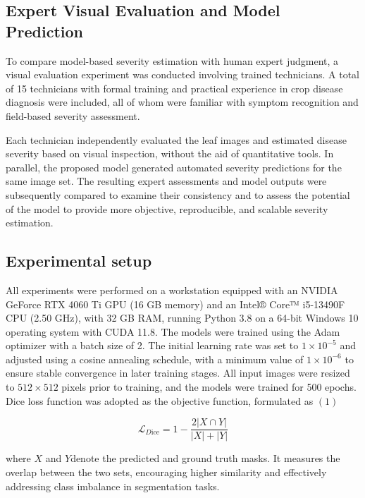 \documentclass[
]{article}
\begin{document}
\hypertarget{expert-visual-evaluation-and-model-prediction}{%
\subsection{Expert Visual Evaluation and Model
Prediction}\label{expert-visual-evaluation-and-model-prediction}}

To compare model-based severity estimation with human expert judgment, a
visual evaluation experiment was conducted involving trained
technicians. A total of 15 technicians with formal training and
practical experience in crop disease diagnosis were included, all of
whom were familiar with symptom recognition and field-based severity
assessment.

Each technician independently evaluated the leaf images and estimated
disease severity based on visual inspection, without the aid of
quantitative tools. In parallel, the proposed model generated automated
severity predictions for the same image set. The resulting expert
assessments and model outputs were subsequently compared to examine
their consistency and to assess the potential of the model to provide
more objective, reproducible, and scalable severity estimation.

\hypertarget{experimental-setup}{%
\subsection{Experimental setup}\label{experimental-setup}}

All experiments were performed on a workstation equipped with an NVIDIA
GeForce RTX 4060 Ti GPU (16 GB memory) and an Intel® Core™ i5-13490F CPU
(2.50 GHz), with 32 GB RAM, running Python 3.8 on a 64-bit Windows 10
operating system with CUDA 11.8. The models were trained using the Adam
optimizer with a batch size of 2. The initial learning rate was set to
\(1 \times 10^{-5}\) and adjusted using a cosine annealing schedule, with a minimum
value of \(1 \times 10^{-6}\) to ensure stable convergence in later training stages.
All input images were resized to \(512 \times 512\) pixels prior to training, and
the models were trained for 500 epochs. Dice loss function was adopted
as the objective function, formulated as \(\left( 1 \right)\)

\begin{equation}
\mathcal{L}_{D\text{ice}} = 1 - \frac{2|X \cap Y|}{\left| X \right| + |Y|}
\tag{1}
\end{equation}

where \(X\) and \(Y\)denote the predicted and ground truth masks. It
measures the overlap between the two sets, encouraging higher similarity
and effectively addressing class imbalance in segmentation tasks.
\end{document}
